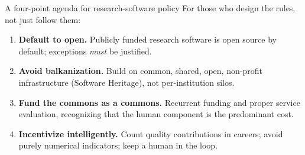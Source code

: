 \begin{callout}{A four-point agenda for research-software policy}
\small For those who design the rules, not just follow them:
\begin{enumerate}[nosep,leftmargin=*]
  \item \textbf{Default to open.} Publicly funded research software is open source by default;
        exceptions \emph{must} be justified.
  \item \textbf{Avoid balkanization.} Build on common, shared, open, non-profit infrastructure
        (Software Heritage), not per-institution silos.
  \item \textbf{Fund the commons as a commons.} Recurrent funding and proper service evaluation,
        recognizing that the human component is the predominant cost.
  \item \textbf{Incentivize intelligently.} Count quality contributions in careers; avoid purely
        numerical indicators; keep a human in the loop.
\end{enumerate}
\end{callout}

